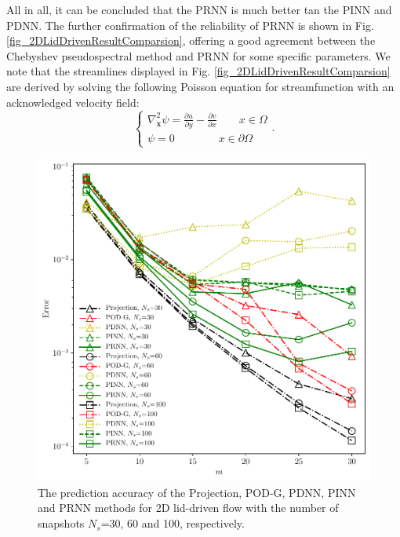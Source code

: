 \documentclass[preprint, 10pt]{elsarticle}
\begin{document}
All in all, it can be concluded that the PRNN is much better tan the PINN and PDNN. The further confirmation of the reliability of PRNN is shown in Fig. \ref{fig_2DLidDrivenResultComparsion}, offering a good agreement between the Chebyshev pseudospectral method and PRNN for some specific parameters. We note that the streamlines displayed in Fig. \ref{fig_2DLidDrivenResultComparsion} are derived by solving the following Poisson equation for streamfunction  with an acknowledged velocity field:
\begin{equation}
\left \{
\begin{aligned}
{\nabla_{\mathbf{x}} ^2}{\psi}
 = \frac{\partial u}{\partial y} - \frac{\partial v}{\partial x} \qquad x \in \Omega\\
\psi = 0  \qquad \qquad    x \in \partial \Omega
\end{aligned}
 \right .
 .
\label{eq_Streamfunction}
\end{equation}


\begin{figure}[!ht]
  \centering
  \includegraphics[width=12cm]{../../pythonNN/2DLidDriven/fig/ErrorComparsion_SampleNum.pdf}
\caption{The prediction accuracy of the Projection, POD-G, PDNN, PINN and PRNN methods for 2D lid-driven flow with the number of snapshots $N_s$=30, 60 and 100, respectively.}
\label{fig_2DLidDrivenErrorComparsion_SampleNum}
\end{figure}
\end{document}
